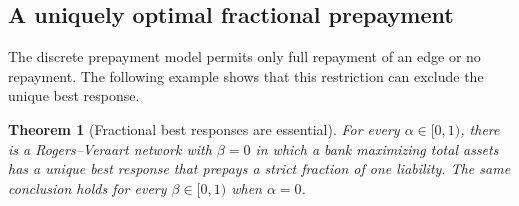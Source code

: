 \documentclass[11pt]{article}
\newtheorem{theorem}{Theorem}[section]
\theoremstyle{definition}
\theoremstyle{remark}
\begin{document}
\subsection{A uniquely optimal fractional prepayment}

The discrete prepayment model permits only full repayment of an edge or no
repayment.  The following example shows that this restriction can exclude the
unique best response.

\begin{theorem}[Fractional best responses are essential]
\label{thm:fractional-best-response}
For every $\alpha\in[0,1)$, there is a Rogers--Veraart network with $\beta=0$
in which a bank maximizing total assets has a unique best response that
prepays a strict fraction of one liability.  The same conclusion holds for
every $\beta\in[0,1)$ when $\alpha=0$.
\end{theorem}
\end{document}
